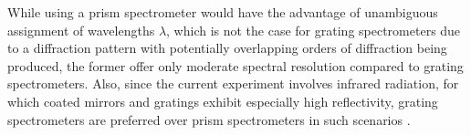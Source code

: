 While using a prism spectrometer would have the advantage of unambiguous assignment of wavelengths $\lambda$, which is not the case for grating spectrometers due to a diffraction pattern with potentially overlapping orders of diffraction being produced, the former offer only moderate spectral resolution compared to grating spectrometers. Also, since the current experiment involves infrared radiation, for which coated mirrors and gratings exhibit especially high reflectivity, grating spectrometers are preferred over prism spectrometers in such scenarios \cite{demtroder2014laser}.

\newpage